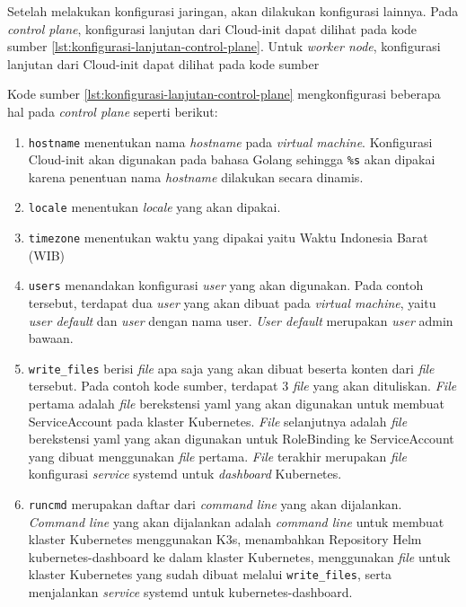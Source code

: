 Setelah melakukan konfigurasi jaringan, akan dilakukan konfigurasi lainnya.
Pada \emph{control plane}, konfigurasi lanjutan dari Cloud-init dapat dilihat 
pada kode sumber \ref{lst:konfigurasi-lanjutan-control-plane}.
Untuk \emph{worker node}, konfigurasi lanjutan dari Cloud-init dapat dilihat
pada kode sumber



Kode sumber \ref{lst:konfigurasi-lanjutan-control-plane}
mengkonfigurasi beberapa hal pada \emph{control plane} seperti berikut:

\begin{enumerate}
  
  \item \lstinline{hostname} menentukan nama \emph{hostname} pada \emph{virtual machine}.
    Konfigurasi Cloud-init akan digunakan pada bahasa Golang sehingga \lstinline{%s}
    akan dipakai karena penentuan nama \emph{hostname} dilakukan secara dinamis.

  \item \lstinline{locale} menentukan \emph{locale} yang akan dipakai.

  \item \lstinline{timezone} menentukan waktu yang dipakai yaitu Waktu Indonesia Barat (WIB)

  \item \lstinline{users} menandakan konfigurasi \emph{user} yang akan digunakan. Pada
    contoh tersebut, terdapat dua \emph{user} yang akan dibuat pada \emph{virtual machine},
    yaitu \emph{user default} dan \emph{user} dengan nama user. \emph{User default} merupakan
    \emph{user} admin bawaan.

  \item \lstinline{write_files} berisi \emph{file} apa saja yang akan dibuat beserta konten
    dari \emph{file} tersebut. Pada contoh kode sumber, terdapat 3 \emph{file} yang akan dituliskan.
    \emph{File} pertama adalah \emph{file} berekstensi yaml yang akan digunakan untuk membuat
    ServiceAccount pada klaster Kubernetes. \emph{File} selanjutnya adalah \emph{file} berekstensi
    yaml yang akan digunakan untuk RoleBinding ke ServiceAccount yang dibuat menggunakan
    \emph{file} pertama. \emph{File} terakhir merupakan \emph{file} konfigurasi 
    \emph{service} systemd untuk \emph{dashboard} Kubernetes.

  \item \lstinline{runcmd} merupakan daftar dari \emph{command line} yang akan dijalankan.
    \emph{Command line} yang akan dijalankan adalah \emph{command line} untuk membuat klaster
    Kubernetes menggunakan K3s, menambahkan Repository Helm kubernetes-dashboard ke dalam
    klaster Kubernetes, menggunakan \emph{file} untuk klaster Kubernetes yang sudah dibuat
    melalui \lstinline{write_files}, serta menjalankan \emph{service} systemd untuk
    kubernetes-dashboard.

\end{enumerate}


